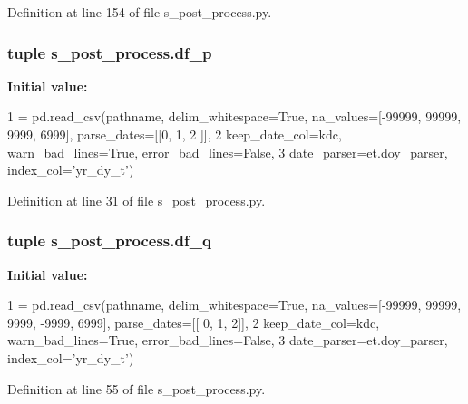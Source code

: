 Definition at line 154 of file s\+\_\+post\+\_\+process.\+py.

\hypertarget{namespaces__post__process_a7c2928665b805f82e2f875eabbbc8cc7}{}
\subsubsection[{df\+\_\+p}]{\setlength{\rightskip}{0pt plus 5cm}tuple s\+\_\+post\+\_\+process.\+df\+\_\+p}\label{namespaces__post__process_a7c2928665b805f82e2f875eabbbc8cc7}
{\bfseries Initial value\+:}
\begin{DoxyCode}
1 = pd.read\_csv(pathname, delim\_whitespace=\textcolor{keyword}{True}, na\_values=[-99999, 99999, 9999, 6999], parse\_dates=[[0, 1, 2
      ]],
2                        keep\_date\_col=kdc, warn\_bad\_lines=\textcolor{keyword}{True}, error\_bad\_lines=\textcolor{keyword}{False},
3                        date\_parser=et.doy\_parser, index\_col=\textcolor{stringliteral}{'yr\_dy\_t'})
\end{DoxyCode}


Definition at line 31 of file s\+\_\+post\+\_\+process.\+py.

\hypertarget{namespaces__post__process_a786c188707f3609514c3f64b95e67f7e}{}
\subsubsection[{df\+\_\+q}]{\setlength{\rightskip}{0pt plus 5cm}tuple s\+\_\+post\+\_\+process.\+df\+\_\+q}\label{namespaces__post__process_a786c188707f3609514c3f64b95e67f7e}
{\bfseries Initial value\+:}
\begin{DoxyCode}
1 = pd.read\_csv(pathname, delim\_whitespace=\textcolor{keyword}{True}, na\_values=[-99999, 99999, 9999, -9999, 6999], parse\_dates=[[
      0, 1, 2]],
2                        keep\_date\_col=kdc, warn\_bad\_lines=\textcolor{keyword}{True}, error\_bad\_lines=\textcolor{keyword}{False},
3                        date\_parser=et.doy\_parser, index\_col=\textcolor{stringliteral}{'yr\_dy\_t'})
\end{DoxyCode}


Definition at line 55 of file s\+\_\+post\+\_\+process.\+py.


